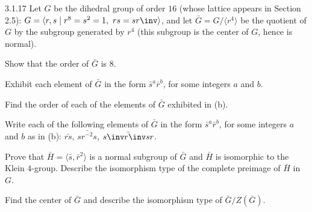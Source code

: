 \begin{exercise}{3.1.17}
    Let $G$ be the dihedral group of order $16$ (whose lattice appears in Section 2.5): $G = \langle r,s \mid r^8 = s^2 = 1,\ rs = sr\inv  \rangle$, and let $\bar{G} = G/\langle r^4 \rangle$ be the quotient of $G$ by the subgroup generated by $r^4$ (this subgroup is the center of $G$, hence is normal).
    \begin{subexercises}
        \item Show that the order of $\bar{G}$ is $8$.
        \item Exhibit each element of $\bar{G}$ in the form $\bar{s}^a \bar{r}^b$, for some integers $a$ and $b$.
        \item Find the order of each of the elements of $\bar{G}$ exhibited in (b).
        \item Write each of the following elements of $\bar{G}$ in the form $\bar{s}^a \bar{r}^b$, for some integers $a$ and $b$ as in (b): $\bar{rs}$, $\bar{sr^{-2}s}$, $\bar{s\inv r\inv sr}$.
        \item Prove that $\bar{H} = \langle \bar{s}, \bar{r}^2 \rangle$ is a normal subgroup of $\bar{G}$ and $\bar{H}$ is isomorphic to the Klein $4$-group.
	    Describe the isomorphism type of the complete preimage of $\bar{H}$ in $G$.
        \item Find the center of $\bar G$ and describe the isomorphism type of $\bar G/Z(\bar G)$.
    \end{subexercises}
\end{exercise}


